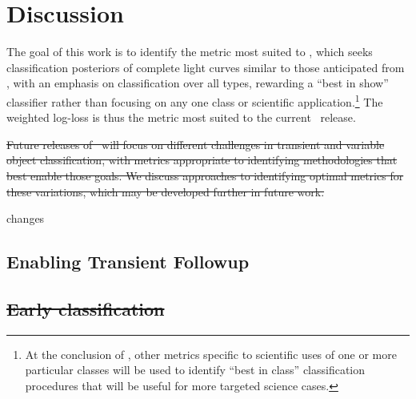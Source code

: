 \section{Discussion}
\label{sec:discussion}

The goal of this work is to identify the metric most suited to \plasticc, which seeks classification posteriors of complete light curves similar to those anticipated from \lsst, with an emphasis on classification over all types, rewarding a ``best in show'' classifier rather than focusing on any one class or scientific application.\footnote{At the conclusion of \plasticc, other metrics specific to scientific uses of one or more particular classes will be used to identify ``best in class'' classification procedures that will be useful for more targeted science cases.}
The weighted log-loss is thus the metric most suited to the current \plasticc\ release.

\sout{Future releases of \plasticc\ will focus on different challenges in transient and variable object classification, with metrics appropriate to identifying methodologies that best enable those goals.
We discuss approaches to identifying optimal metrics for these variations, which may be developed further in future work.}

changes{\subsection{Enabling Transient Followup}}
\subsection{\sout{Early classification}}
\label{sec:early}

